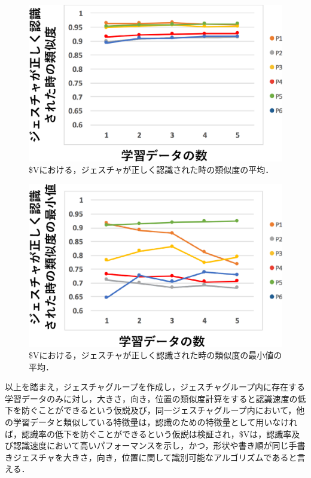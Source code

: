 \begin{figure}[!h]
\centering
\includegraphics[width=0.7\columnwidth]{img/rec_sim.eps}
\caption{\$Vにおける，ジェスチャが正しく認識された時の類似度の平均．}
\label{fig:rec_sim}
\end{figure}

\begin{figure}[!h]
\centering
\includegraphics[width=0.7\columnwidth]{img/rec_min.eps}
\caption{\$Vにおける，ジェスチャが正しく認識された時の類似度の最小値の平均．}
\label{fig:rec_min}
\end{figure}

\clearpage
以上を踏まえ，ジェスチャグループを作成し，ジェスチャグループ内に存在する学習データのみに対し，大きさ，向き，位置の類似度計算をすると認識速度の低下を防ぐことができるという仮説及び，同一ジェスチャグループ内において，他の学習データと類似している特徴量は，認識のための特徴量として用いなければ，認識率の低下を防ぐことができるという仮説は検証され，\$Vは，認識率及び認識速度において高いパフォーマンスを示し，かつ，形状や書き順が同じ手書きジェスチャを大きさ，向き，位置に関して識別可能なアルゴリズムであると言える．

